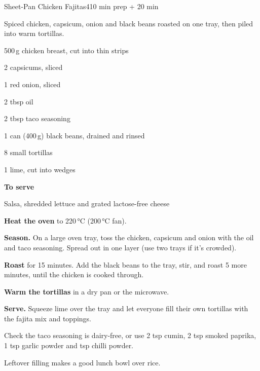 \begin{recipebox}{Sheet-Pan Chicken Fajitas}{4}{10 min prep + 20 min}

Spiced chicken, capsicum, onion and black beans roasted on one tray, then piled
into warm tortillas.

\begin{ingredients}
  \item 500\,g chicken breast, cut into thin strips
  \item 2 capsicums, sliced
  \item 1 red onion, sliced
  \item 2 tbsp oil
  \item 2 tbsp taco seasoning
  \item 1 can (400\,g) black beans, drained and rinsed
  \item 8 small tortillas
  \item 1 lime, cut into wedges
  \item[] \textbf{To serve}
  \item Salsa, shredded lettuce and grated lactose-free cheese
\end{ingredients}

\begin{method}
  \item \textbf{Heat the oven} to 220\,°C (200\,°C fan).
  \item \textbf{Season.} On a large oven tray, toss the chicken, capsicum and onion
        with the oil and taco seasoning. Spread out in one layer (use two trays if
        it's crowded).
  \item \textbf{Roast} for 15 minutes. Add the black beans to the tray, stir, and
        roast 5 more minutes, until the chicken is cooked through.
  \item \textbf{Warm the tortillas} in a dry pan or the microwave.
  \item \textbf{Serve.} Squeeze lime over the tray and let everyone fill their own
        tortillas with the fajita mix and toppings.
\end{method}

\begin{notelist}
  \item Check the taco seasoning is dairy-free, or use 2 tsp cumin, 2 tsp smoked
        paprika, 1 tsp garlic powder and  tsp chilli powder.
  \item Leftover filling makes a good lunch bowl over rice.
\end{notelist}

\end{recipebox}
